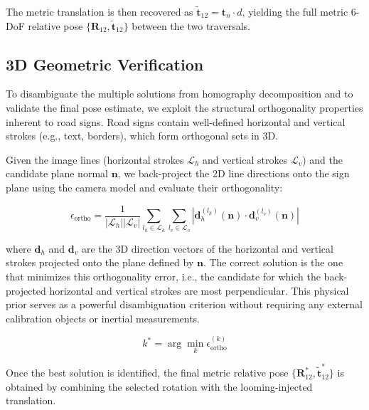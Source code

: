 \documentclass[runningheads]{llncs}
\begin{document}
The metric translation is then recovered as $\tilde{\mathbf{t}}_{12} =
\mathbf{t}_n \cdot d$, yielding the full metric 6-DoF relative pose
$\{\mathbf{R}_{12}, \tilde{\mathbf{t}}_{12}\}$ between the two traversals.

\subsection{3D Geometric Verification}

To disambiguate the multiple solutions from homography decomposition and to
validate the final pose estimate, we exploit the structural orthogonality
properties inherent to road signs. Road signs contain well-defined horizontal
and vertical strokes (e.g., text, borders), which form orthogonal sets in 3D.

Given the image lines (horizontal strokes $\mathcal{L}_h$ and vertical strokes
$\mathcal{L}_v$) and the candidate plane normal $\mathbf{n}$, we back-project
the 2D line directions onto the sign plane using the camera model and evaluate
their orthogonality:

\begin{equation}
\epsilon_{\text{ortho}} = \frac{1}{|\mathcal{L}_h||\mathcal{L}_v|}
\sum_{l_h \in \mathcal{L}_h} \sum_{l_v \in \mathcal{L}_v}
\left| \mathbf{d}_h^{(l_h)}( \mathbf{n} ) \cdot \mathbf{d}_v^{(l_v)}( \mathbf{n} ) \right|
\label{eq:ortho}
\end{equation}

where $\mathbf{d}_h$ and $\mathbf{d}_v$ are the 3D direction vectors of the
horizontal and vertical strokes projected onto the plane defined by $\mathbf{n}$.
The correct solution is the one that minimizes this orthogonality error, i.e.,
the candidate for which the back-projected horizontal and vertical strokes are
most perpendicular. This physical prior serves as a powerful disambiguation
criterion without requiring any external calibration objects or inertial
measurements.

\begin{equation}
k^* = \arg\min_{k} \epsilon_{\text{ortho}}^{(k)}
\label{eq:best_solution}
\end{equation}

Once the best solution is identified, the final metric relative pose
$\{\mathbf{R}_{12}^*, \tilde{\mathbf{t}}_{12}^*\}$ is obtained by combining the
selected rotation with the looming-injected translation.
\end{document}
